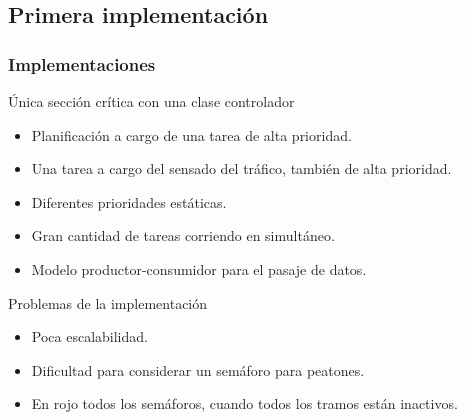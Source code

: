 \begin{frame}
\begin{block}{}
\begin{columns}[T]
\begin{column}{.50\textwidth}
	\end{column}
\end{columns}
\end{block}
\end{frame}

\subsection{Primera implementación}

\begin{frame}
\frametitle{Implementaciones}
\begin{block}{Única sección crítica con una clase controlador}
	\begin{itemize}
		\item Planificación a cargo de una tarea de alta prioridad.
		\item Una tarea a cargo del sensado del tráfico, también de alta prioridad.
		\item Diferentes prioridades estáticas.
		\item Gran cantidad de tareas corriendo en simultáneo.
		\item Modelo productor-consumidor para el pasaje de datos.
	\end{itemize}
\end{block}
\begin{block}{Problemas de la implementación}
	\begin{itemize}
		\item Poca escalabilidad.
		\item Dificultad para considerar un semáforo para peatones.
		\item En rojo todos los semáforos, cuando todos los tramos están inactivos.
	\end{itemize}
\end{block}
\end{frame}

